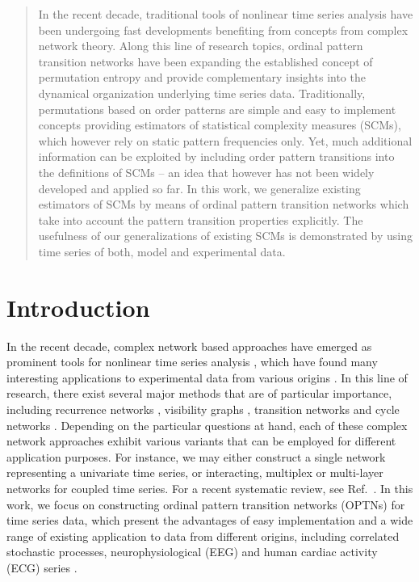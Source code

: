 \documentclass[12pt,aip,cha,reprint,nofootinbib]{revtex4-1}
\begin{document}
\maketitle

\begin{quotation}
In the recent decade, traditional tools of nonlinear time series analysis have been undergoing fast developments benefiting from concepts from complex network theory. Along this line of research topics, ordinal pattern transition networks have been expanding the established concept of permutation entropy and provide complementary insights into the dynamical organization underlying time series data. Traditionally, permutations based on order patterns are simple and easy to implement concepts providing estimators of statistical complexity measures (SCMs), which however rely on static pattern frequencies only. Yet, much additional information can be exploited by including order pattern transitions into the definitions of SCMs -- an idea that however has not been widely developed and applied so far. In this work, we generalize existing estimators of SCMs by means of ordinal pattern transition networks which take into account the pattern transition properties explicitly. The usefulness of our generalizations of existing SCMs is demonstrated by using time series of both, model and experimental data. 
\end{quotation}

\section{Introduction}
In the recent decade, complex network based approaches have emerged as prominent tools for nonlinear time series analysis \cite{Kantz97,Sprott2003}, which have found many interesting applications to experimental data from various origins \cite{ZouPR2018}. In this line of research, there exist several major methods that are of particular importance, including recurrence networks \cite{MarwanPLA2009,Donner2010a}, visibility graphs \cite{Lacasa2008,Nunez2012}, transition networks \cite{Nicolis2005,MichaelChaos2015} and cycle networks \cite{ZhangPRL2006}. Depending on the particular questions at hand, each of these complex network approaches exhibit various variants that can be employed for different application purposes. For instance, we may either construct a single network representing a univariate time series, or interacting, multiplex or multi-layer networks for coupled time series. For a recent systematic review, see Ref.~\cite{ZouPR2018}. In this work, we focus on constructing ordinal pattern transition networks (OPTNs) for time series data, which present the advantages of easy implementation and a wide range of existing application to data from different origins, including correlated stochastic processes, neurophysiological (EEG) and human cardiac activity (ECG) series \cite{MichaelChaos2015,KulpChaos2016,zhangSciRep2017,McCullough2017b,BorgesAMC2019,Subramaniyam2020}. 
\end{document}
